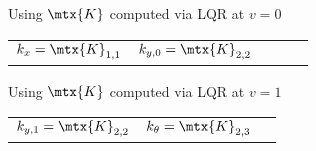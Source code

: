 \begin{theorem}
  Using $\mtx{K}$ computed via LQR at $v = 0$
  \begin{figurekey}
    \begin{tabular}{lllll}
      $k_x = \mtx{K}_{1, 1}$ & $k_{y, 0} = \mtx{K}_{2, 2}$
    \end{tabular}
  \end{figurekey}

  Using $\mtx{K}$ computed via LQR at $v = 1$
  \begin{figurekey}
    \begin{tabular}{lll}
        $k_{y, 1} = \mtx{K}_{2, 2}$ & $k_{\theta} = \mtx{K}_{2, 3}$
    \end{tabular}
  \end{figurekey}
\end{theorem}
